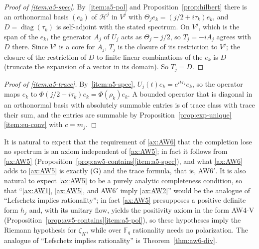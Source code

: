 \documentclass[11pt]{amsart}
\theoremstyle{plain}
\theoremstyle{definition}
\theoremstyle{remark}
\numberwithin{equation}{section}
\newcommand{\F}{\mathbb{F}}
\newcommand{\cH}{\mathscr{H}}
\DeclareMathOperator{\diag}{diag}
\begin{document}
\begin{proof}[Proof of \ref{item:a5-spec}]
By~\ref{item:a5-pol} and Proposition~\ref{prop:hilbert} there is an
orthonormal basis $(e_k)$ of $\cH^j$ in $V^j$ with $\Theta_je_k=
(j/2+i\tau_k)e_k$, and $D=\diag(\tau_k)$ is self-adjoint with the
stated spectrum. On $V^j$, which is the span of the $e_k$, the
generator $A_j$ of $U_j$ acts as $\Theta_j-j/2$, so $T_j=-iA_j$
agrees with $D$ there. Since $V^j$ is a core for $A_j$, $T_j$ is the
closure of its restriction to $V^j$; the closure of the restriction of
$D$ to finite linear combinations of the $e_k$ is $D$ (truncate the
expansion of a vector in its domain). So $T_j=D$.
\end{proof}

\begin{proof}[Proof of \ref{item:a5-trace}]
By~\ref{item:a5-spec}, $U_j(t)e_k=e^{it\tau_k}e_k$, so the operator
maps $e_k$ to $\Phi(j/2+i\tau_k)e_k=\Phi(\rho_k)e_k$. A bounded
operator that is diagonal in an orthonormal basis with absolutely
summable entries is of trace class with trace their sum, and the
entries are summable by Proposition~\ref{prop:exp-unique}
\ref{item:eu-conv} with $c=m_j$.
\end{proof}

It is natural to expect that the requirement of \ref{ax:AW6} that the
completion lose no spectrum is an axiom independent of \ref{ax:AW5}; in
fact it follows from \ref{ax:AW5}
(Proposition~\ref{prop:aw5-contains}\ref{item:a5-spec}), and what
\ref{ax:AW6} adds to \ref{ax:AW5} is exactly (G) and the trace formula,
that is, AW6$'$. It is also natural to expect \ref{ax:AW5} to be a
purely analytic completeness condition, so that ``\ref{ax:AW1},
\ref{ax:AW5}, and AW6$'$ imply \ref{ax:AW2}'' would be the analogue of
``Lefschetz implies rationality''; in fact \ref{ax:AW5} presupposes a
positive definite form $h_j$ and, with its unitary flow, yields the
positivity axiom in the form AW4-V
(Proposition~\ref{prop:aw5-contains}\ref{item:a5-pol}), so these
hypotheses imply the Riemann hypothesis for $\zeta_K$, while over $\F_q$
rationality needs no polarization. The analogue of ``Lefschetz implies
rationality'' is Theorem~\ref{thm:aw6-div}.
\end{document}
